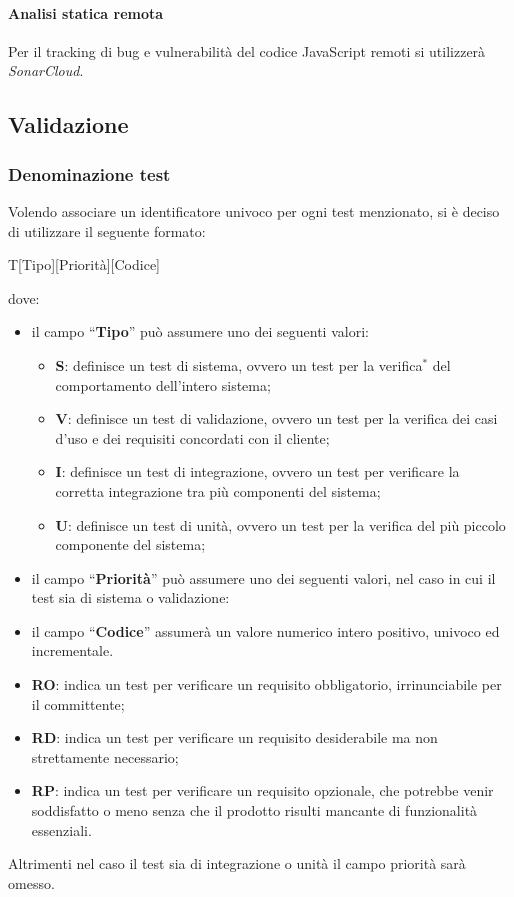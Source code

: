 \documentclass[11pt,a4paper]{article}
\begin{document}
{	\paragraph{Analisi statica remota\\}
	Per il tracking di bug e vulnerabilità del codice JavaScript remoti si utilizzerà \textit{SonarCloud}.
	
			
	\subsection{Validazione}
	\subsubsection{Denominazione test}
	Volendo associare un identificatore univoco per ogni test menzionato, si \`e deciso di utilizzare il seguente formato:
	\begin{center}
		T[Tipo][Priorità][Codice]
	\end{center}
	dove:
	\begin{itemize}
		
		\item il campo “\textbf{Tipo}” può assumere uno dei seguenti valori:
		\begin{itemize}
			\item \textbf{S}: definisce un test di sistema, ovvero un test per la verifica$^*$ del comportamento dell'intero sistema;
			\item \textbf{V}: definisce un test di validazione, ovvero un test per la verifica dei casi d'uso e dei requisiti concordati con il cliente;
			\item \textbf{I}: definisce un test di integrazione, ovvero un test per verificare la corretta integrazione tra più componenti del sistema;
			\item \textbf{U}: definisce un test di unità, ovvero un test per la verifica del più piccolo componente del sistema;
		\end{itemize}
	\item il campo “\textbf{Priorità}” può assumere uno dei seguenti valori, nel caso in cui il test sia di sistema o validazione:
		\item il campo “\textbf{Codice}” assumerà un valore numerico intero positivo, univoco ed incrementale.
	\end{itemize}
\begin{itemize}
	
	\item \textbf{RO}: indica un test per verificare un requisito obbligatorio, irrinunciabile per il committente;
	\item \textbf{RD}: indica un test per verificare un requisito desiderabile ma non strettamente necessario;
	\item \textbf{RP}: indica un test per verificare un requisito opzionale, che potrebbe venir soddisfatto o meno senza che il prodotto risulti mancante di funzionalità essenziali.
\end{itemize}
Altrimenti nel caso il test sia di integrazione o unità il campo priorità sarà omesso.
\\
	
}
\end{document}
